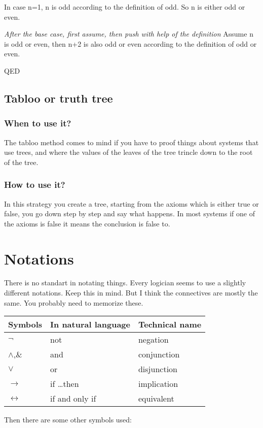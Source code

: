 \documentclass{article}
\begin{document}
In case n=1, n is odd according to the definition of odd. So n is either
odd or even.

\emph{After the base case, first assume, then push with help of the definition}
Assume n is odd or even, then n+2 is also odd or even according to the
definition of odd or even.

QED

\subsection{Tabloo or truth tree}
\subsubsection{When to use it?}
The tabloo method comes to mind if you have to proof things about systems
that use trees, and where the values of the leaves of the tree trincle down
to the root of the tree.

\subsubsection{How to use it?}
In this strategy you create a tree, starting from the axioms which is either
true or false, you go down step by step and say what happens. In most systems
if one of the axioms is false it means the conclusion is false to.

\section{Notations}
\label{notations}
There is no standart in notating things. Every logician seems to use a
slightly different notations. Keep this in mind. But I think the connectives
are mostly the same. You probably need to memorize these.

\noindent
\begin{tabular}{@{}lll@{}}
Symbols&
In natural language &
Technical name \\ \toprule
$\neg$ 			& not 				& negation \\
$\wedge$,\& 	& and 				& conjunction \\
$\vee$ 			& or 				& disjunction\\
$\to$	& if \ldots then 	& implication\\
$\leftrightarrow$	& if and only if 	& equivalent\\ \bottomrule
\end{tabular}


Then there are some other symbols used:
\end{document}
